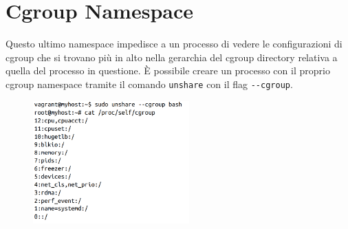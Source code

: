 \section{Cgroup Namespace}

Questo ultimo namespace impedisce a un processo di vedere le configurazioni di
cgroup che si trovano più in alto nella gerarchia del cgroup directory relativa
a quella del processo in questione. È possibile creare un processo con il proprio
cgroup namespace tramite il comando \verb|unshare| con il flag \verb|--cgroup|.

\begin{figure}[H]
    \centering
    \includegraphics[width=6cm, keepaspectratio]{capitoli/os_security/imgs/cspace.png}
\end{figure}